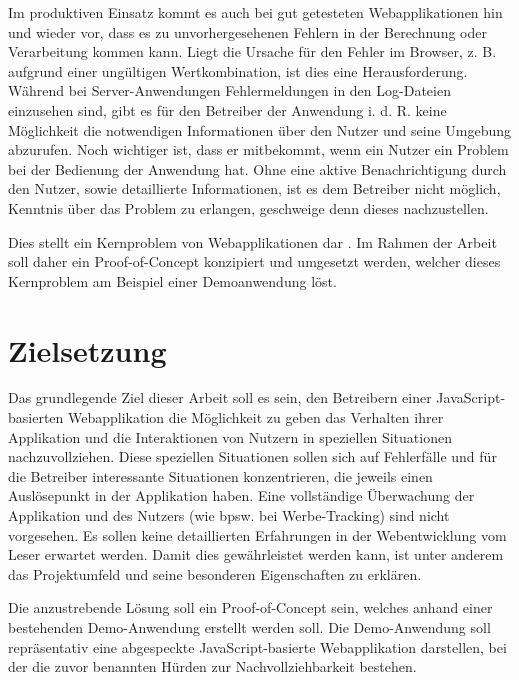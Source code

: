 Im produktiven Einsatz kommt es auch bei gut getesteten Webapplikationen hin und wieder vor, dass es zu unvorhergesehenen Fehlern in der Berechnung oder Verarbeitung kommen kann. Liegt die Ursache für den Fehler im Browser, z. B. aufgrund einer ungültigen Wertkombination, ist dies eine Herausforderung. Während bei Server-Anwendungen Fehlermeldungen in den Log-Dateien einzusehen sind, gibt es für den Betreiber der Anwendung i. d. R. keine Möglichkeit die notwendigen Informationen über den Nutzer und seine Umgebung abzurufen. Noch wichtiger ist, dass er mitbekommt, wenn ein Nutzer ein Problem bei der Bedienung der Anwendung hat. Ohne eine aktive Benachrichtigung durch den Nutzer, sowie detaillierte Informationen, ist es dem Betreiber nicht möglich, Kenntnis über das Problem zu erlangen, geschweige denn dieses nachzustellen.

Dies stellt ein Kernproblem von  Webapplikationen dar \cite{ClientSideMonitoringOfDistributedSystems}. Im Rahmen der Arbeit soll daher ein Proof-of-Concept konzipiert und umgesetzt werden, welcher dieses Kernproblem am Beispiel einer Demoanwendung löst.

\section{Zielsetzung}

Das grundlegende Ziel dieser Arbeit soll es sein, den Betreibern einer JavaScript-basierten Webapplikation die Möglichkeit zu geben das Verhalten ihrer Applikation und die Interaktionen von Nutzern in speziellen Situationen nachzuvollziehen. Diese speziellen Situationen sollen sich auf Fehlerfälle und für die Betreiber interessante Situationen konzentrieren, die jeweils einen Auslösepunkt in der Applikation haben. Eine vollständige Überwachung der Applikation und des Nutzers (wie bpsw. bei Werbe-Tracking) sind nicht vorgesehen. Es sollen keine detaillierten Erfahrungen in der Webentwicklung vom Leser erwartet werden. Damit dies gewährleistet werden kann, ist unter anderem das Projektumfeld und seine besonderen Eigenschaften zu erklären.

Die anzustrebende Lösung soll ein Proof-of-Concept sein, welches anhand einer bestehenden Demo-Anwendung erstellt werden soll. Die Demo-Anwendung soll repräsentativ eine abgespeckte JavaScript-basierte Webapplikation darstellen, bei der die zuvor benannten Hürden zur Nachvollziehbarkeit bestehen.


